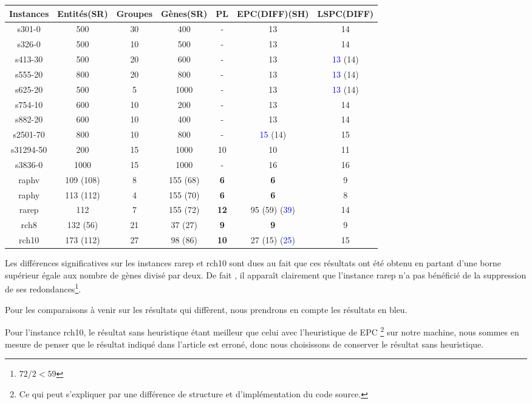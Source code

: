 \begin{center}
\begin{tabular}{|c|c|c|c|c|c|c|}
\hline 
Instances & Entités(SR) & Groupes & Gènes(SR) & PL & EPC(DIFF)(SH) & LSPC(DIFF) \\ 
\hline 
s301-0 & 500 & 30 & 400 & - & 13 & 14 \\ 
\hline 
s326-0 & 500 & 10 & 500 & - & 13 & 14 \\ 
\hline 
s413-30 & 500 & 20 & 600 & - & 13 & \textcolor{blue}{13} (14) \\ 
\hline 
s555-20 & 800 & 20 & 800 & - & 13 & \textcolor{blue}{13} (14) \\ 
\hline 
s625-20 & 500 & 5 & 1000 & - & 13 & \textcolor{blue}{13} (14) \\ 
\hline 
s754-10 & 600 & 10 & 200 & - & 13 & 14 \\ 
\hline 
s882-20 & 600 & 10 & 400 & - & 13 & 14 \\ 
\hline 
s2501-70 & 800 & 10 & 800 & - & \textcolor{blue}{15} (14) & 15 \\ 
\hline 
s31294-50 & 200 & 15 & 1000 & 10 & 10 & 11 \\ 
\hline 
s3836-0 & 1000 & 15 & 1000 & - & 16 & 16 \\ 
\hline 
raphv & 109 (108) & 8 & 155 (68) & \textbf{6} & \textbf{6} & 9 \\ 
\hline 
raphy & 113 (112) & 4 & 155 (70) & \textbf{6} & \textbf{6} & 8 \\ 
\hline 
rarep & 112 & 7 & 155 (72) & \textbf{12} & 95 (59) (\textcolor{blue}{39}) & 14 \\ 
\hline 
rch8 & 132 (56) & 21 & 37 (27) & \textbf{9} & \textbf{9} & 9 \\ 
\hline 
rch10 & 173 (112) & 27 & 98 (86) & \textbf{10} & 27 (15) (\textcolor{blue}{25}) & 15 \\ 
\hline 
\end{tabular} 
\end{center}



Les différences significatives sur les instances rarep et rch10 sont dues au fait que ces résultats ont été obtenu en partant d'une borne supérieur égale aux nombre de gènes divisé par deux. De fait , il apparaît clairement que l'instance rarep n'a pas bénéficié de la suppression de ses redondances\footnote{$72/2<59$}.

Pour les comparaisons à venir sur les résultats qui diffèrent, nous prendrons en compte les résultats en bleu.

Pour l'instance rch10, le résultat sans heuristique étant meilleur que celui avec l'heuristique de EPC \footnote{Ce qui peut s'expliquer par une différence de structure et d'implémentation du code source.} sur notre machine, nous sommes en mesure de penser que le résultat indiqué dans l'article est erroné, donc nous choisissons de conserver le résultat sans heuristique.


